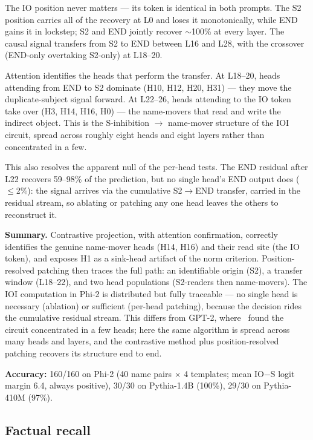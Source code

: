 \documentclass[11pt]{article}
\begin{document}
The IO position never matters --- its token is identical in both prompts. The S2
position carries all of the recovery at L0 and loses it monotonically, while END
gains it in lockstep; S2 and END jointly recover $\sim$100\% at every layer. The
causal signal transfers from S2 to END between L16 and L28, with the crossover
(END-only overtaking S2-only) at L18--20.

Attention identifies the heads that perform the transfer. At L18--20, heads
attending from END to S2 dominate (H10, H12, H20, H31) --- they move the
duplicate-subject signal forward. At L22--26, heads attending to the IO token
take over (H3, H14, H16, H0) --- the name-movers that read and write the indirect
object. This is the S-inhibition $\rightarrow$ name-mover structure of the IOI circuit,
spread across roughly eight heads and eight layers rather than concentrated in a
few.

This also resolves the apparent null of the per-head tests. The END residual
after L22 recovers 59--98\% of the prediction, but no single head's END output
does ($\le$2\%): the signal arrives via the cumulative S2$\rightarrow$END transfer, carried in
the residual stream, so ablating or patching any one head leaves the others to
reconstruct it.

\textbf{Summary.} Contrastive projection, with attention confirmation, correctly
identifies the genuine name-mover heads (H14, H16) and their read site (the IO
token), and exposes H1 as a sink-head artifact of the norm criterion.
Position-resolved patching then traces the full path: an identifiable origin
(S2), a transfer window (L18--22), and two head populations (S2-readers then
name-movers). The IOI computation in Phi-2 is distributed but fully traceable ---
no single head is necessary (ablation) or sufficient (per-head patching),
because the decision rides the cumulative residual stream. This differs from
GPT-2, where~\citet{wang2023} found the circuit concentrated in a few heads; here the
same algorithm is spread across many heads and layers, and the contrastive
method plus position-resolved patching recovers its structure end to end.

\textbf{Accuracy:} 160/160 on Phi-2 (40 name pairs $\times$ 4 templates; mean
IO$-$S logit margin 6.4, always positive), 30/30 on Pythia-1.4B (100\%),
29/30 on Pythia-410M (97\%).

\subsection{Factual recall}
\end{document}
